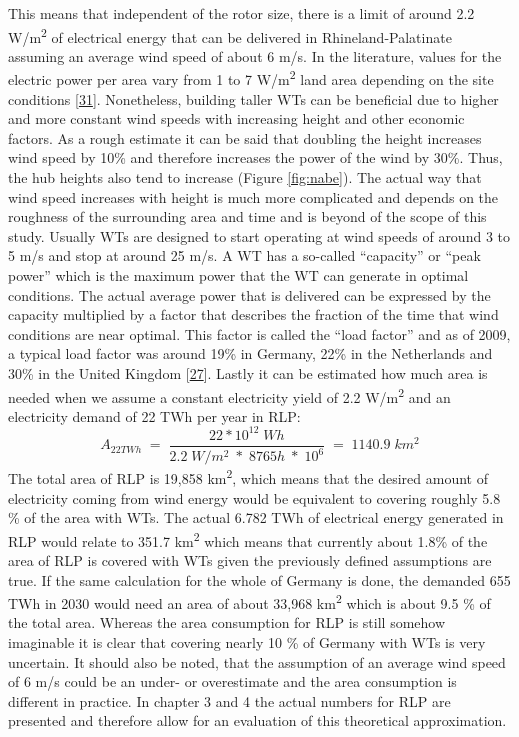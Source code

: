 \documentclass[a4paper,11pt]{article}
\begin{document}
This means that independent of the rotor size, there is a limit of around 2.2 W/m\textsuperscript{2} of electrical energy that can be delivered in Rhineland-Palatinate assuming an average wind speed of about 6 m/s. In the literature, values for the electric power per area vary from 1 to 7 W/m\textsuperscript{2} land area depending on the site conditions {[}\protect\hyperlink{ref-SvenLinow.2020}{31}{]}. Nonetheless, building taller WTs can be beneficial due to higher and more constant wind speeds with increasing height and other economic factors. As a rough estimate it can be said that doubling the height increases wind speed by 10\% and therefore increases the power of the wind by 30\%. Thus, the hub heights also tend to increase (Figure \ref{fig:nabe}). The actual way that wind speed increases with height is much more complicated and depends on the roughness of the surrounding area and time and is beyond of the scope of this study. Usually WTs are designed to start operating at wind speeds of around 3 to 5 m/s and stop at around 25 m/s. A WT has a so-called ``capacity'' or ``peak power'' which is the maximum power that the WT can generate in optimal conditions. The actual average power that is delivered can be expressed by the capacity multiplied by a factor that describes the fraction of the time that wind conditions are near optimal. This factor is called the ``load factor'' and as of 2009, a typical load factor was around 19\% in Germany, 22\% in the Netherlands and 30\% in the United Kingdom {[}\protect\hyperlink{ref-DavidJCMacKay.2009}{27}{]}. Lastly it can be estimated how much area is needed when we assume a constant electricity yield of 2.2 W/m\textsuperscript{2} and an electricity demand of 22 TWh per year in RLP:
\begin{equation}
A_{22TWh}\;=\;\frac{22 * 10^{12}\; Wh}{2.2\;W/m^2\; *\; 8765h\; *\; 10^6}\;=\;1140.9\;km^2
\end{equation}
The total area of RLP is 19,858 km\textsuperscript{2}, which means that the desired amount of electricity coming from wind energy would be equivalent to covering roughly 5.8 \% of the area with WTs. The actual 6.782 TWh of electrical energy generated in RLP would relate to 351.7 km\textsuperscript{2} which means that currently about 1.8\% of the area of RLP is covered with WTs given the previously defined assumptions are true. If the same calculation for the whole of Germany is done, the demanded 655 TWh in 2030 would need an area of about 33,968 km\textsuperscript{2} which is about 9.5 \% of the total area. Whereas the area consumption for RLP is still somehow imaginable it is clear that covering nearly 10 \% of Germany with WTs is very uncertain. It should also be noted, that the assumption of an average wind speed of 6 m/s could be an under- or overestimate and the area consumption is different in practice. In chapter 3 and 4 the actual numbers for RLP are presented and therefore allow for an evaluation of this theoretical approximation.
\end{document}
